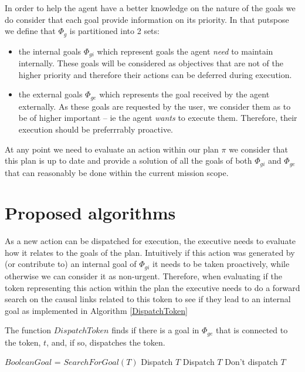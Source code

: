 In order to help the agent have a better knowledge on the nature of
the goals we do consider that each goal provide information on its
priority. In that putspose we define that $\Phi_g$ is partitioned into
2 sets:
\begin{itemize}
\item the internal goals $\Phi_{gi}$ which represent goals the agent
  {\em need} to maintain internally. These goals will be considered 
  as objectives that are not of the higher priority and therefore
  their actions can be deferred during execution.
\item the external goals $\Phi_{ge}$ which represents the goal
  received by the agent externally. As these goals are requested by
  the user, we consider them as to be of higher important -- ie the
  agent {\em wants} to execute them. Therefore, their execution should
  be preferrrably proactive.
\end{itemize}

At any point we need to evaluate an action within our plan $\pi$ we
consider that this plan is up to date and provide a solution of all 
the goals of both $\Phi_{gi}$ and $\Phi_{ge}$ that can reasonably  be
done within the current mission scope.


\section{Proposed algorithms}

As a new action can be dispatched for execution, the executive
needs to evaluate how it relates to the goals of the plan. Intuitively
if this action was generated by (or contribute to) an internal goal of
$\Phi_{gi}$ it needs to be taken proactively, while otherwise we can 
consider it as non-urgent. Therefore, when evaluating if the token
representing this action  within the plan the executive needs to do a
forward search on the causal links related to this token to see if
they lead to an internal goal as implemented in Algorithm \ref{DispatchToken}


\begin{algorithm}
\caption{The function $DispatchToken$ finds if there is a goal in $\Phi_{ge}$ that is connected
to the token, $t$, and, if so, dispatches the token.}
\label{DispatchToken}
\begin{algorithmic}
\State $Boolean Goal$ = $SearchForGoal( T )$
	\State \Return Dispatch $T$
	\State \Return Dispatch $T$
\Else
	\State \Return Don't dispatch $T$
\EndIf
\EndFunction
\end{algorithmic}
\end{algorithm}

